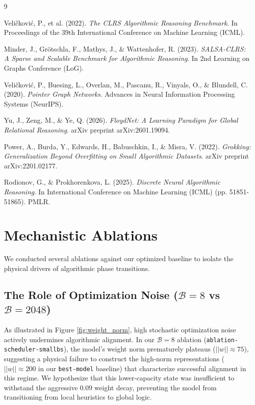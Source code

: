 \documentclass{article}
\begin{document}
\clearpage
\begin{thebibliography}{9}

Veli\v{c}kovi\'{c}, P., et al. (2022). 
\textit{The CLRS Algorithmic Reasoning Benchmark}. 
In Proceedings of the 39th International Conference on Machine Learning (ICML).

Minder, J., Gr\"{o}tschla, F., Mathys, J., \& Wattenhofer, R. (2023). 
\textit{SALSA-CLRS: A Sparse and Scalable Benchmark for Algorithmic Reasoning}. 
In 2nd Learning on Graphs Conference (LoG).

Veli\v{c}kovi\'{c}, P., Buesing, L., Overlan, M., Pascanu, R., Vinyals, O., \& Blundell, C. (2020). 
\textit{Pointer Graph Networks}. 
Advances in Neural Information Processing Systems (NeurIPS).

Yu, J., Zeng, M., \& Ye, Q. (2026). 
\textit{FloydNet: A Learning Paradigm for Global Relational Reasoning}. 
arXiv preprint arXiv:2601.19094.

Power, A., Burda, Y., Edwards, H., Babuschkin, I., \& Misra, V. (2022). 
\textit{Grokking: Generalization Beyond Overfitting on Small Algorithmic Datasets}. 
arXiv preprint arXiv:2201.02177.

Rodionov, G., \& Prokhorenkova, L. (2025). 
\textit{Discrete Neural Algorithmic Reasoning}. 
In International Conference on Machine Learning (ICML) (pp. 51851-51865). PMLR.

\end{thebibliography}

\clearpage
\appendix

\section{Mechanistic Ablations}
\label{sec:ablations}

We conducted several ablations against our optimized baseline to isolate the physical drivers of algorithmic phase transitions.

\subsection{The Role of Optimization Noise ($\mathcal{B}=8$ vs $\mathcal{B}=2048$)}

As illustrated in Figure \ref{fig:weight_norm}, high stochastic optimization noise actively undermines algorithmic alignment. In our $\mathcal{B}=8$ ablation (\texttt{ablation-scheduler-smallbs}), the model's weight norm prematurely plateaus ($||w|| \approx 75$), suggesting a physical failure to construct the high-norm representations ($||w|| \approx 200$ in our \texttt{best-model} baseline) that characterize successful alignment in this regime. We hypothesize that this lower-capacity state was insufficient to withstand the aggressive $0.09$ weight decay, preventing the model from transitioning from local heuristics to global logic.
\end{document}
